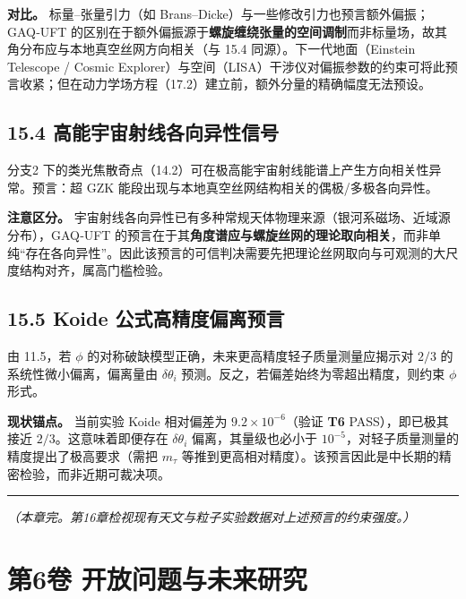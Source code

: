 \textbf{对比。} 标量--张量引力（如
Brans--Dicke）与一些修改引力也预言额外偏振；GAQ‑UFT
的区别在于额外偏振源于\textbf{螺旋缠绕张量的空间调制}而非标量场，故其角分布应与本地真空丝网方向相关（与
15.4 同源）。下一代地面（Einstein Telescope / Cosmic
Explorer）与空间（LISA）干涉仪对偏振参数的约束可将此预言收紧；但在动力学场方程（17.2）建立前，额外分量的精确幅度无法预设。

\subsection{15.4
高能宇宙射线各向异性信号}\label{ux9ad8ux80fdux5b87ux5b99ux5c04ux7ebfux5404ux5411ux5f02ux6027ux4fe1ux53f7}

分支2
下的类光焦散奇点（14.2）可在极高能宇宙射线能谱上产生方向相关性异常。预言：超
GZK 能段出现与本地真空丝网结构相关的偶极/多极各向异性。

\textbf{注意区分。}
宇宙射线各向异性已有多种常规天体物理来源（银河系磁场、近域源分布），GAQ‑UFT
的预言在于其\textbf{角度谱应与螺旋丝网的理论取向相关}，而非单纯``存在各向异性''。因此该预言的可信判决需要先把理论丝网取向与可观测的大尺度结构对齐，属高门槛检验。

\subsection{15.5 Koide
公式高精度偏离预言}\label{koide-ux516cux5f0fux9ad8ux7cbeux5ea6ux504fux79bbux9884ux8a00}

由 11.5，若 \(\phi\)
的对称破缺模型正确，未来更高精度轻子质量测量应揭示对 \(2/3\)
的系统性微小偏离，偏离量由 \(\delta\theta_i\)
预测。反之，若偏差始终为零超出精度，则约束 \(\phi\) 形式。

\textbf{现状锚点。} 当前实验 Koide 相对偏差为 \(9.2\times10^{-6}\)（验证
\textbf{T6} PASS），即已极其接近 \(2/3\)。这意味着即便存在
\(\delta\theta_i\) 偏离，其量级也必小于
\(10^{-5}\)，对轻子质量测量的精度提出了极高要求（需把 \(m_\tau\)
等推到更高相对精度）。该预言因此是中长期的精密检验，而非近期可裁决项。

\begin{center}\rule{0.5\linewidth}{0.5pt}\end{center}

\emph{（本章完。第16章检视现有天文与粒子实验数据对上述预言的约束强度。）}

\section{第6卷
开放问题与未来研究}\label{ux7b2c6ux5377-ux5f00ux653eux95eeux9898ux4e0eux672aux6765ux7814ux7a76}

